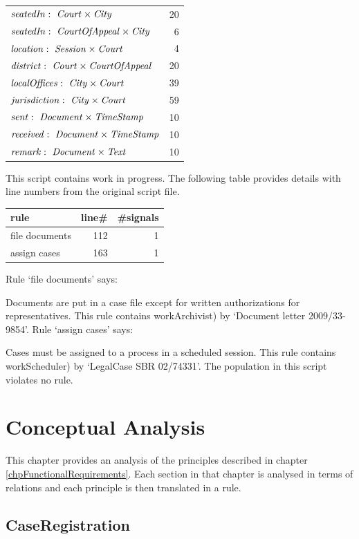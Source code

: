 \documentclass[10pt,a4paper]{report}              %
\theoremstyle{plain}\theorembodyfont{\rmfamily}\newtheorem{definition}{Definition}[section]
\theoremstyle{plain}\theorembodyfont{\rmfamily}\newtheorem{designrule}[definition]{Requirement}
\def\id#1{\mbox{\em #1\/}}
\newcommand{\rel}{\times}
\newcommand{\declare}[3]{\id{#1}:\ \id{#2}\rel\id{#3}}
\begin{document}
\begin{center}
\begin{tabular}{lr}
$\declare{seatedIn}{Court}{City}$ & 20\\
$\declare{seatedIn}{CourtOfAppeal}{City}$ & 6\\
$\declare{location}{Session}{Court}$ & 4\\
$\declare{district}{Court}{CourtOfAppeal}$ & 20\\
$\declare{localOffices}{City}{Court}$ & 39\\
$\declare{jurisdiction}{City}{Court}$ & 59\\
$\declare{sent}{Document}{TimeStamp}$ & 10\\
$\declare{received}{Document}{TimeStamp}$ & 10\\
$\declare{remark}{Document}{Text}$ & 10\\
\end{tabular}
\end{center}

This script contains work in progress. The following table provides details with line numbers from the original script file.

\begin{center}
\begin{tabular}{lrr}
rule & line\# & \#signals\\
\hline
file documents & 112 & 1\\
assign cases & 163 & 1\\
\end{tabular}
\end{center}

Rule `file documents' says: 

Documents are put in a case file except for written authorizations for
representatives.
This rule contains workArchivist) by `Document letter 2009/33-9854'. 
Rule `assign cases' says: 

Cases must be assigned to a process in a scheduled session.
This rule contains workScheduler) by `LegalCase SBR 02/74331'. 
The population in this script violates no rule. 

\chapter{Conceptual Analysis}\label{chpConceptualAnalysis}

This chapter provides an analysis of the principles described in chapter \ref{chpFunctionalRequirements}. Each section in that chapter is analysed in terms of relations and each principle is then translated in a rule. 

\section{CaseRegistration}
\end{document}
